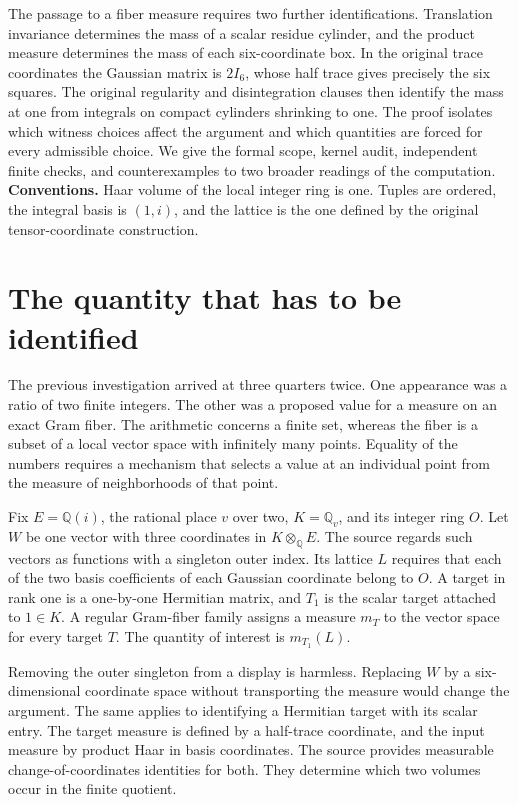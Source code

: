 \documentclass[12pt,letterpaper]{article}
\begin{document}
The passage to a fiber measure requires two further identifications. Translation invariance determines the mass of a scalar residue cylinder, and the product measure determines the mass of each six-coordinate box. In the original trace coordinates the Gaussian matrix is $2I_6$, whose half trace gives precisely the six squares. The original regularity and disintegration clauses then identify the mass at one from integrals on compact cylinders shrinking to one. The proof isolates which witness choices affect the argument and which quantities are forced for every admissible choice. We give the formal scope, kernel audit, independent finite checks, and counterexamples to two broader readings of the computation.
\vfill\textbf{Conventions.} Haar volume of the local integer ring is one. Tuples are ordered, the integral basis is $(1,i)$, and the lattice is the one defined by the original tensor-coordinate construction.
\clearpage{\small\setlength{\parskip}{0pt}\tableofcontents}\clearpage{}
\section{The quantity that has to be identified}
The previous investigation arrived at three quarters twice. One appearance was a ratio of two finite integers. The other was a proposed value for a measure on an exact Gram fiber. The arithmetic concerns a finite set, whereas the fiber is a subset of a local vector space with infinitely many points. Equality of the numbers requires a mechanism that selects a value at an individual point from the measure of neighborhoods of that point.

Fix $E=\mathbb Q(i)$, the rational place $v$ over two, $K=\mathbb Q_v$, and its integer ring $O$. Let $W$ be one vector with three coordinates in $K\otimes_{\mathbb Q} E$. The source regards such vectors as functions with a singleton outer index. Its lattice $L$ requires that each of the two basis coefficients of each Gaussian coordinate belong to $O$. A target in rank one is a one-by-one Hermitian matrix, and $T_1$ is the scalar target attached to $1\in K$. A regular Gram-fiber family assigns a measure $m_T$ to the vector space for every target $T$. The quantity of interest is $m_{T_1}(L)$.

Removing the outer singleton from a display is harmless. Replacing $W$ by a six-dimensional coordinate space without transporting the measure would change the argument. The same applies to identifying a Hermitian target with its scalar entry. The target measure is defined by a half-trace coordinate, and the input measure by product Haar in basis coordinates. The source provides measurable change-of-coordinates identities for both. They determine which two volumes occur in the finite quotient.
\end{document}
